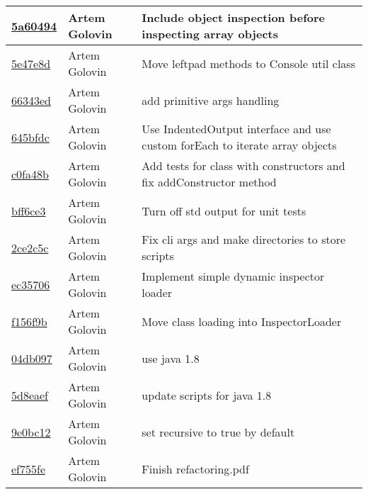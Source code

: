 \begin{tabularx}{\textwidth}{l l X}
\href{https://github.com/awave1/ObjectInspector/commit/5a60494c178ae449c73b64573945d738fa660fbc}{5a60494} & Artem Golovin & Include object inspection before inspecting array objects\\ \hline
\href{https://github.com/awave1/ObjectInspector/commit/5e47e8d3c80ca582c40d589319183ff8bbc04975}{5e47e8d} & Artem Golovin & Move leftpad methods to Console util class\\ \hline
\href{https://github.com/awave1/ObjectInspector/commit/66343ed9e306d8d95fc154743233476df9d8e01b}{66343ed} & Artem Golovin & add primitive args handling\\ \hline
\href{https://github.com/awave1/ObjectInspector/commit/645bfdce0ecb6be66d752fd30a505777d78f0cc4}{645bfdc} & Artem Golovin & Use IndentedOutput interface and use custom forEach to iterate array objects\\ \hline
\href{https://github.com/awave1/ObjectInspector/commit/c0fa48ba955e0b6b2a3a5b4cea0799a48608cd52}{c0fa48b} & Artem Golovin & Add tests for class with constructors and fix addConstructor method\\ \hline
\href{https://github.com/awave1/ObjectInspector/commit/bff6ce3c5e65af191b41dbea9ac64098c79f8d77}{bff6ce3} & Artem Golovin & Turn off std output for unit tests\\ \hline
\href{https://github.com/awave1/ObjectInspector/commit/2ce2c5cbcab69a44628f32983d441161834f1c94}{2ce2c5c} & Artem Golovin & Fix cli args and make directories to store scripts\\ \hline
\href{https://github.com/awave1/ObjectInspector/commit/ec357060b553399d386e08a757cf66dfdc4cd7a8}{ec35706} & Artem Golovin & Implement simple dynamic inspector loader\\ \hline
\href{https://github.com/awave1/ObjectInspector/commit/f156f9b121be09cd64888343984a15e279719ded}{f156f9b} & Artem Golovin & Move class loading into InspectorLoader\\ \hline
\href{https://github.com/awave1/ObjectInspector/commit/04db097989e2c8f71446b8f012f509a6132645c8}{04db097} & Artem Golovin & use java 1.8\\ \hline
\href{https://github.com/awave1/ObjectInspector/commit/5d8eaeff2d1d2ee2cce366d225657b37b16ae0fd}{5d8eaef} & Artem Golovin & update scripts for java 1.8\\ \hline
\href{https://github.com/awave1/ObjectInspector/commit/9e0bc1287fc27e5ed1d0be29bcf8d116e50d972a}{9e0bc12} & Artem Golovin & set recursive to true by default\\ \hline
\href{https://github.com/awave1/ObjectInspector/commit/ef755fe5a97445bba3121a3a69ac2069f66994cc}{ef755fe} & Artem Golovin & Finish refactoring.pdf\\ \hline

\end{tabularx}
